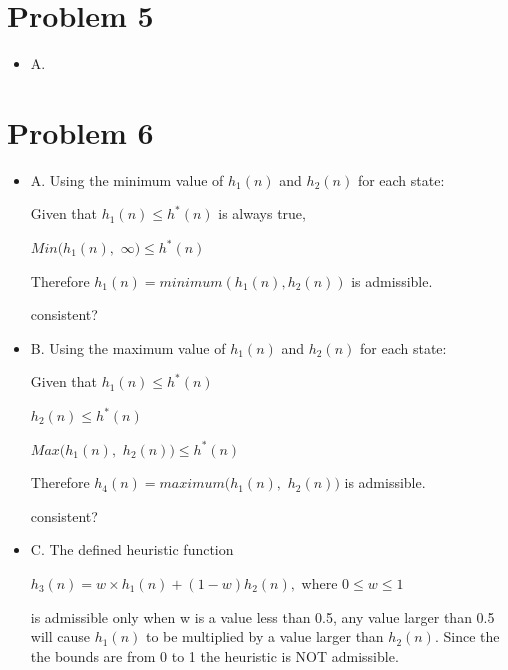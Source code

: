 \documentclass[10pt,a4paper]{article}
\begin{document}
	\section*{Problem 5}
	\begin{itemize}
		\item
		A.
	\end{itemize}
	
	\section*{Problem 6}
	\begin{itemize}
		\item
		A. Using the minimum value of $h_1(n)$ and $h_2(n)$ for each state:
		
		\begin{center}
			Given that $h_1(n) \leq h^*(n)$ is always true, 
			
			$Min(h_1(n),$ $\infty) \leq h^*(n)$
		
			Therefore $h_1(n) = minimum (h_1(n), h_2(n))$ is admissible. 
			
			consistent? 
		
		\end{center}
		
		\item
		B. Using the maximum value of $h_1(n)$ and $h_2(n)$ for each state:
		
		\begin{center}
			
			Given that $h_1(n) \leq h^*(n)$
			
			$h_2(n) \leq h^*(n)$
			
			$Max(h_1(n),$ $h_2(n)) \leq h^*(n)$
			
			Therefore $h_4(n) = maximum(h_1(n),$ $h_2(n))$ is admissible.
			
			consistent? 
			
		\end{center}
		
		
		\item
		C. The defined heuristic function 
		\begin{center}
			$h_3(n) = w \times h_1(n) + (1-w)h_2(n),$ where $0 \leq w \leq 1$
		\end{center}
		
		is admissible only when w is a value less than 0.5, any value larger than 0.5 will cause $h_1(n)$ to be multiplied by a value larger than $h_2(n)$.  Since the the bounds are from 0 to 1 the heuristic is NOT admissible. 
			

\end{itemize}
\end{document}
